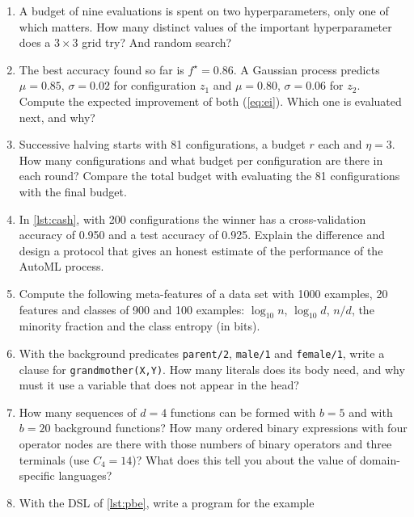 \begin{enumerate}[label=\textbf{4.\arabic*},ref=4.\arabic*,leftmargin=*,itemsep=6pt]
  \item\label{exr4:grid} A budget of nine evaluations is spent on two hyperparameters, only one of which
        matters. How many distinct values of the important hyperparameter does a $3\times3$ grid try? And
        random search?
  \item\label{exr4:ei} The best accuracy found so far is $f^\star=0.86$. A Gaussian process predicts
        $\mu=0.85$, $\sigma=0.02$ for configuration $z_1$ and $\mu=0.80$, $\sigma=0.06$ for $z_2$. Compute
        the expected improvement of both (\cref{eq:ei}). Which one is evaluated next, and why?
  \item\label{exr4:sh} Successive halving starts with 81 configurations, a budget $r$ each and $\eta=3$.
        How many configurations and what budget per configuration are there in each round? Compare the
        total budget with evaluating the 81 configurations with the final budget.
  \item\label{exr4:optimism} In \cref{lst:cash}, with 200 configurations the winner has a cross-validation
        accuracy of 0.950 and a test accuracy of 0.925. Explain the difference and design a protocol that
        gives an honest estimate of the performance of the AutoML process.
  \item\label{exr4:meta} Compute the following meta-features of a data set with 1000 examples, 20 features
        and classes of 900 and 100 examples: $\log_{10}n$, $\log_{10}d$, $n/d$, the minority fraction and
        the class entropy (in bits).
  \item\label{exr4:ilp} With the background predicates \texttt{parent/2}, \texttt{male/1} and
        \texttt{female/1}, write a clause for \texttt{grandmother(X,Y)}. How many literals does its body
        need, and why must it use a variable that does not appear in the head?
  \item\label{exr4:bias} How many sequences of $d=4$ functions can be formed with $b=5$ and with $b=20$
        background functions? How many ordered binary expressions with four operator nodes are there with
        those numbers of binary operators and three terminals (use $C_4=14$)? What does this tell you about
        the value of domain-specific languages?
  \item\label{exr4:pbe} With the DSL of \cref{lst:pbe}, write a program for the example

\end{enumerate}
